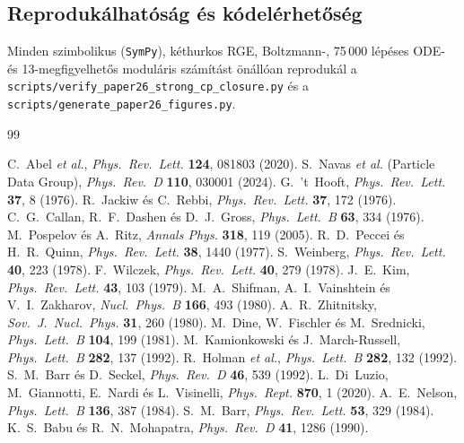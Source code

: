 \documentclass[11pt,a4paper]{article}
\begin{document}
\subsection*{Reprodukálhatóság és kódelérhetőség}
Minden szimbolikus (\texttt{SymPy}), kéthurkos RGE, Boltzmann-, 75\,000 lépéses ODE- és 13-megfigyelhetős moduláris számítást önállóan reprodukál a \texttt{scripts/verify\_paper26\_strong\_cp\_closure.py} és a \texttt{scripts/generate\_paper26\_figures.py}.

\begin{thebibliography}{99}
\small
\raggedright
\setlength{\itemsep}{2pt}
 C.~Abel \textit{et al.}, \emph{Phys.\ Rev.\ Lett.} \textbf{124}, 081803 (2020).
 S.~Navas \textit{et al.} (Particle Data Group), \emph{Phys.\ Rev.\ D} \textbf{110}, 030001 (2024).
 G.~'t~Hooft, \emph{Phys.\ Rev.\ Lett.} \textbf{37}, 8 (1976).
 R.~Jackiw és C.~Rebbi, \emph{Phys.\ Rev.\ Lett.} \textbf{37}, 172 (1976).
 C.~G.~Callan, R.~F.~Dashen és D.~J.~Gross, \emph{Phys.\ Lett.\ B} \textbf{63}, 334 (1976).
 M.~Pospelov és A.~Ritz, \emph{Annals Phys.} \textbf{318}, 119 (2005).
 R.~D.~Peccei és H.~R.~Quinn, \emph{Phys.\ Rev.\ Lett.} \textbf{38}, 1440 (1977).
 S.~Weinberg, \emph{Phys.\ Rev.\ Lett.} \textbf{40}, 223 (1978).
 F.~Wilczek, \emph{Phys.\ Rev.\ Lett.} \textbf{40}, 279 (1978).
 J.~E.~Kim, \emph{Phys.\ Rev.\ Lett.} \textbf{43}, 103 (1979).
 M.~A.~Shifman, A.~I.~Vainshtein és V.~I.~Zakharov, \emph{Nucl.\ Phys.\ B} \textbf{166}, 493 (1980).
 A.~R.~Zhitnitsky, \emph{Sov.\ J.\ Nucl.\ Phys.} \textbf{31}, 260 (1980).
 M.~Dine, W.~Fischler és M.~Srednicki, \emph{Phys.\ Lett.\ B} \textbf{104}, 199 (1981).
 M.~Kamionkowski és J.~March-Russell, \emph{Phys.\ Lett.\ B} \textbf{282}, 137 (1992).
 R.~Holman \textit{et al.}, \emph{Phys.\ Lett.\ B} \textbf{282}, 132 (1992).
 S.~M.~Barr és D.~Seckel, \emph{Phys.\ Rev.\ D} \textbf{46}, 539 (1992).
 L.~Di~Luzio, M.~Giannotti, E.~Nardi és L.~Visinelli, \emph{Phys.\ Rept.} \textbf{870}, 1 (2020).
 A.~E.~Nelson, \emph{Phys.\ Lett.\ B} \textbf{136}, 387 (1984).
 S.~M.~Barr, \emph{Phys.\ Rev.\ Lett.} \textbf{53}, 329 (1984).
 K.~S.~Babu és R.~N.~Mohapatra, \emph{Phys.\ Rev.\ D} \textbf{41}, 1286 (1990).

\end{thebibliography}
\end{document}
